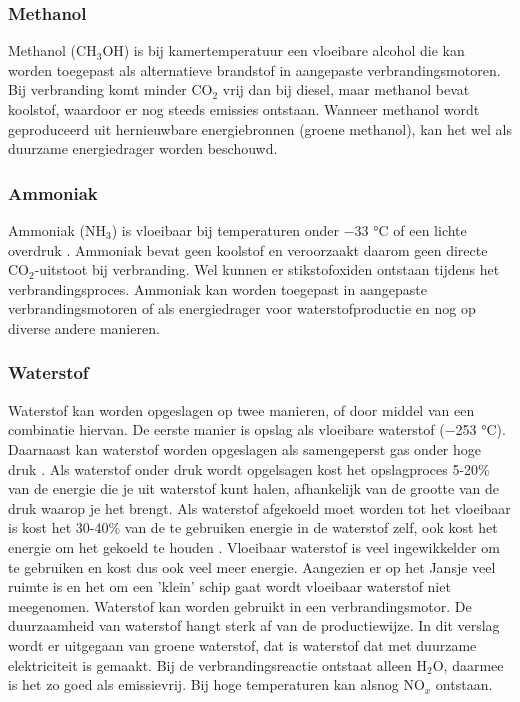 \subsubsection{\textbf{Methanol}}
Methanol (CH$_3$OH) is bij kamertemperatuur een vloeibare alcohol die kan worden toegepast als alternatieve brandstof in aangepaste verbrandingsmotoren. Bij verbranding komt minder CO$_2$ vrij dan bij diesel, maar methanol bevat koolstof, waardoor er nog steeds emissies ontstaan. Wanneer methanol wordt geproduceerd uit hernieuwbare energiebronnen (groene methanol), kan het wel als duurzame energiedrager worden beschouwd.

\subsubsection{\textbf{Ammoniak}}
Ammoniak (NH$_3$) is vloeibaar bij temperaturen onder −33 °C of een lichte overdruk \cite{EngineeringToolboxAmmonia}. Ammoniak bevat geen koolstof en veroorzaakt daarom geen directe CO$_2$-uitstoot bij verbranding. Wel kunnen er stikstofoxiden ontstaan tijdens het verbrandingsproces. Ammoniak kan worden toegepast in aangepaste verbrandingsmotoren of als energiedrager voor waterstofproductie en nog op diverse andere manieren.

\subsubsection{\textbf{Waterstof}}
Waterstof kan worden opgeslagen op twee manieren, of door middel van een combinatie hiervan. De eerste manier is opslag als vloeibare waterstof (−253 °C). Daarnaast kan waterstof worden opgeslagen als samengeperst gas onder hoge druk \cite{EngineeringToolboxHydrogen}. Als waterstof onder druk wordt opgelsagen kost het opslagproces 5-20\% van de energie die je uit waterstof kunt halen, afhankelijk van de grootte van de druk waarop je het brengt. Als waterstof afgekoeld moet worden tot het vloeibaar is kost het 30-40\% van de te gebruiken energie in de waterstof zelf, ook kost het energie om het gekoeld te houden \cite{doe2009hydrogencompression}. Vloeibaar waterstof is veel ingewikkelder om te gebruiken en kost dus ook veel meer energie. Aangezien er op het Jansje veel ruimte is en het om een 'klein' schip gaat wordt vloeibaar waterstof niet meegenomen.
Waterstof kan worden gebruikt in een verbrandingsmotor. De duurzaamheid van waterstof hangt sterk af van de productiewijze. In dit verslag wordt er uitgegaan van groene waterstof, dat is waterstof dat met duurzame elektriciteit is gemaakt. Bij de verbrandingsreactie ontstaat alleen H$_2$O, daarmee is het zo goed als emissievrij. Bij hoge temperaturen kan alsnog NO$_x$ ontstaan.




